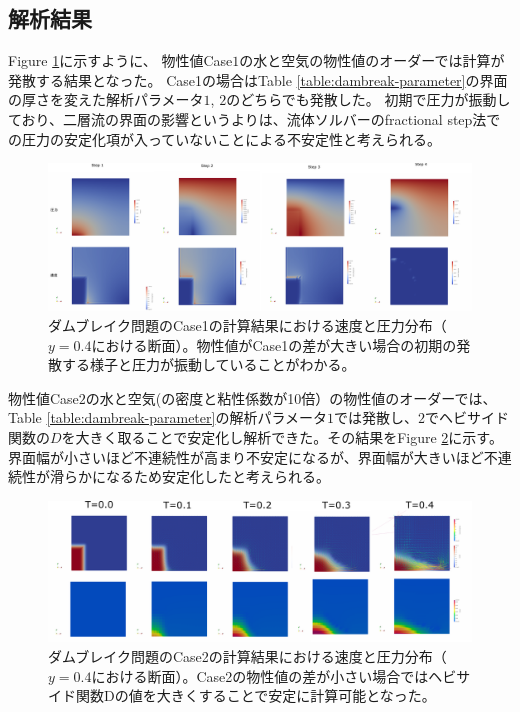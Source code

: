 \documentclass[8pt,a4paper]{article}
\begin{document}
\subsection{解析結果}

Figure \ref{fig:3d-dambreak-diverge}に示すように、
物性値Case$1$の水と空気の物性値のオーダーでは計算が発散する結果となった。
Case1の場合はTable \ref{table:dambreak-parameter}の界面の厚さを変えた解析パラメータ$1$, $2$のどちらでも発散した。
初期で圧力が振動しており、二層流の界面の影響というよりは、流体ソルバーのfractional step法での圧力の安定化項が入っていないことによる不安定性と考えられる。

\begin{figure}[H]
	\centering
	\includegraphics[width=18truecm]{pics/3d-dambreak/diverge_water_air.pdf}
	\caption{ダムブレイク問題のCase1の計算結果における速度と圧力分布（$y=0.4$における断面）。物性値がCase1の差が大きい場合の初期の発散する様子と圧力が振動していることがわかる。}
	\label{fig:3d-dambreak-diverge}
\end{figure}

物性値Case$2$の水と空気(の密度と粘性係数が10倍）の物性値のオーダーでは、Table \ref{table:dambreak-parameter}の解析パラメータ$1$では発散し、$2$でヘビサイド関数の$D$を大きく取ることで安定化し解析できた。その結果をFigure \ref{fig:3d-dambreak-result}に示す。界面幅が小さいほど不連続性が高まり不安定になるが、界面幅が大きいほど不連続性が滑らかになるため安定化したと考えられる。

\begin{figure}[H]
	\centering
	\includegraphics[width=18truecm]{pics/3d-dambreak/levelset_velocity.pdf}
	\caption{ダムブレイク問題のCase2の計算結果における速度と圧力分布（$y=0.4$における断面）。Case2の物性値の差が小さい場合ではヘビサイド関数Dの値を大きくすることで安定に計算可能となった。}
	\label{fig:3d-dambreak-result}
\end{figure}
\end{document}
